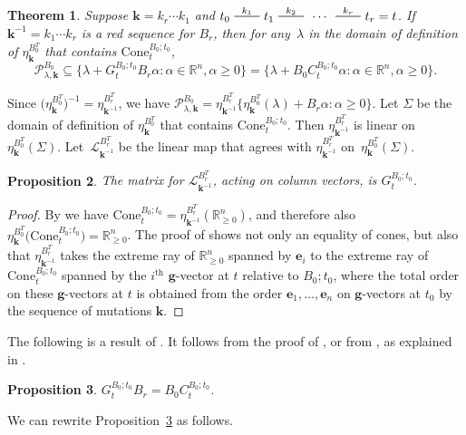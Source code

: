 \documentclass{amsart}
\newtheorem{proposition}{Proposition}[section]
\newtheorem{theorem}[proposition]{Theorem}
\theoremstyle{definition}
\theoremstyle{remark}
\numberwithin{equation}{section}
\newcommand{\reals}{\mathbb R}
\newcommand{\edge}{\,\,\rule[2.7pt]{20pt}{0.5pt}\,\,}
\newcommand{\set}[1]{{\lbrace #1 \rbrace}}
\newcommand{\sett}[1]{{\bigl\lbrace #1 \bigr\rbrace}}
\renewcommand{\th}{^\text{th}}
\newcommand{\0}{{\mathbf{0}}}
\newcommand{\Cone}{\mathrm{Cone}}
\newcommand{\g}{\mathbf{g}}
\newcommand{\kk}{{\boldsymbol{k}}}
\newcommand{\e}{\mathbf{e}}
\renewcommand{\L}{\mathcal{L}}
\renewcommand{\P}{\mathcal{P}}
\renewcommand{\th}{^\text{th}}
\begin{document}
\begin{theorem}\label{P in B0C}
Suppose $\kk=k_r\cdots k_1$ and $t_0\overset{k_1}{\edge}t_1\overset{k_2}{\edge}\,\cdots\,\overset{k_r}{\edge}t_r=t$.
If $\kk^{-1}=k_1\cdots k_r$ is a red sequence for $B_r$, then for any~$\lambda$ in the domain of definition of $\eta_\kk^{B_0^T}$ that contains $\Cone^{B_0;t_0}_t$,
\[\P^{B_0}_{\lambda,\kk}\subseteq\set{\lambda+G_t^{B_0;t_0}B_r\alpha:\alpha\in\reals^n,\alpha\ge0}=\set{\lambda+B_0C_t^{B_0;t_0}\alpha:\alpha\in\reals^n,\alpha\ge0}.\]
\end{theorem}

Since $\bigl(\eta_{\kk}^{B_0^T}\bigr)^{-1}=\eta_{\kk^{-1}}^{B_r^T}$, we have $\P^{B_0}_{\lambda,\kk}=\eta_{\kk^{-1}}^{B_r^T}\sett{\eta_\kk^{B_0^T}(\lambda)+B_r\alpha:\alpha\ge0}$.
Let $\Sigma$ be the domain of definition of $\eta_{\kk}^{B_0^T}$  that contains $\Cone^{B_0;t_0}_t$.
Then $\eta_{\kk^{-1}}^{B_r^T}$ is linear on $\eta_{\kk}^{B_0^T}(\Sigma)$.
Let~$\L_{\kk^{-1}}^{B_r^T}$ be the linear map that agrees with $\eta_{\kk^{-1}}^{B_r^T}$ on~$\eta_{\kk}^{B_0^T}(\Sigma)$.

\begin{proposition}\label{L mat}
The matrix for $\L_{\kk^{-1}}^{B_r^T}$, acting on column vectors, is $G_t^{B_0;t_0}$.
\end{proposition}
\begin{proof}
By \cite[Proposition~8.13]{universal} we have $\Cone^{B_0;t_0}_t=\eta_{\kk^{-1}}^{B_r^T}(\reals_{\ge0}^n)$, and therefore also ${\eta_\kk^{B_0^T}\bigl(\Cone^{B_0;t_0}_t\bigr)=\reals_{\ge0}^n}$.
The proof of \cite[Proposition~8.13]{universal} shows not only an equality of cones, but also that $\eta_{\kk^{-1}}^{B_r^T}$ takes the extreme ray of $\reals_{\ge0}^n$ spanned by $\e_i$ to the extreme ray of $\Cone^{B_0;t_0}_t$ spanned by the $i\th$ $\g$-vector at $t$ relative to $B_0;t_0$, where the total order on these $\g$-vectors at $t$ is obtained from the order $\e_1,\ldots,\e_n$ on $\g$-vectors at $t_0$ by the sequence of mutations $\kk$.
\end{proof}

The following is a result of \cite{NZ}.
It follows from the proof of \cite[Proposition~1.3]{NZ}, or from \cite[(6.14)]{ca4}, as explained in \cite[Remark~2.1]{NZ}.

\begin{proposition}\label{GBBC}
$G_t^{B_0;t_0}B_r=B_0C_t^{B_0;t_0}$.
\end{proposition}

We can rewrite Proposition~\ref{GBBC} as follows.
\end{document}
